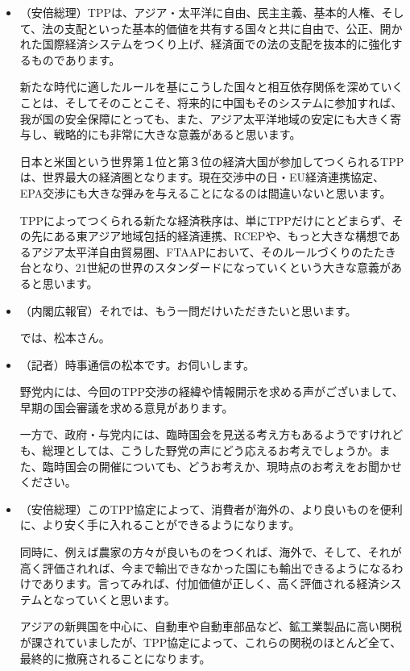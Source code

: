 \begin {itemize}
\item （安倍総理）TPPは、アジア・太平洋に自由、民主主義、基本的人権、そして、法の支配といった基本的価値を共有する国々と共に自由で、公正、開かれた国際経済システムをつくり上げ、経済面での法の支配を抜本的に強化するものであります。\par
  新たな時代に適したルールを基にこうした国々と相互依存関係を深めていくことは、そしてそのことこそ、将来的に中国もそのシステムに参加すれば、我が国の安全保障にとっても、また、アジア太平洋地域の安定にも大きく寄与し、戦略的にも非常に大きな意義があると思います。\par
  日本と米国という世界第１位と第３位の経済大国が参加してつくられるTPPは、世界最大の経済圏となります。現在交渉中の日・EU経済連携協定、EPA交渉にも大きな弾みを与えることになるのは間違いないと思います。\par
  TPPによってつくられる新たな経済秩序は、単にTPPだけにとどまらず、その先にある東アジア地域包括的経済連携、RCEPや、もっと大きな構想であるアジア太平洋自由貿易圏、FTAAPにおいて、そのルールづくりのたたき台となり、21世紀の世界のスタンダードになっていくという大きな意義があると思います。\par
\item （内閣広報官）それでは、もう一問だけいただきたいと思います。\par
  では、松本さん。\par
\item （記者）時事通信の松本です。お伺いします。\par
  野党内には、今回のTPP交渉の経緯や情報開示を求める声がございまして、早期の国会審議を求める意見があります。\par
  一方で、政府・与党内には、臨時国会を見送る考え方もあるようですけれども、総理としては、こうした野党の声にどう応えるお考えでしょうか。また、臨時国会の開催についても、どうお考えか、現時点のお考えをお聞かせください。\par
\item （安倍総理）このTPP協定によって、消費者が海外の、より良いものを便利に、より安く手に入れることができるようになります。\par
  同時に、例えば農家の方々が良いものをつくれば、海外で、そして、それが高く評価されれば、今まで輸出できなかった国にも輸出できるようになるわけであります。言ってみれば、付加価値が正しく、高く評価される経済システムとなっていくと思います。\par
  アジアの新興国を中心に、自動車や自動車部品など、鉱工業製品に高い関税が課されていましたが、TPP協定によって、これらの関税のほとんど全て、最終的に撤廃されることになります。\par

\end{itemize}
